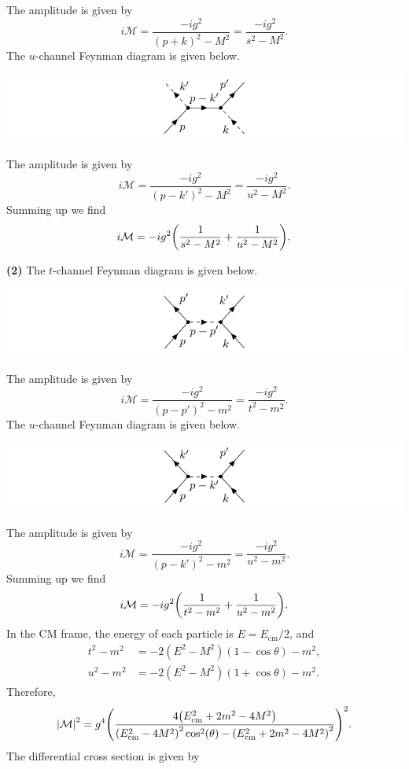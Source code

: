 \documentclass{article}
\makeatletter
\newcommand*{\shifttext}[1]{%
  \settowidth{\@tempdima}{#1}%
  \hspace{-\@tempdima}#1%
}
\newcommand{\plabel}[1]{%
\shifttext{\textbf{#1}\quad}%
}
\makeatother
\begin{document}
The amplitude is given by
\[ i\mathcal{M} = \frac{-ig^2}{(p+k)^2 - M^2} = \frac{-ig^2}{s^2-M^2}. \]
The $u$-channel Feynman diagram is given below.
\begin{center}
    \includegraphics{img/compton/compton-u.pdf}
\end{center}
The amplitude is given by
\[ i\mathcal{M} = \frac{-ig^2}{(p-k')^2 - M^2} = \frac{-ig^2}{u^2-M^2}. \]
Summing up we find
\[ i\mathcal{M} = -ig^2\qty(\frac{1}{s^2 - M^2} + \frac{1}{u^2 - M^2}). \]

\plabel{(2)}%
The $t$-channel Feynman diagram is given below.
\begin{center}
    \includegraphics{img/moller/moller-t.pdf}
\end{center}
The amplitude is given by
\[ i\mathcal{M} = \frac{-ig^2}{(p-p')^2 - m^2} = \frac{-ig^2}{t^2-m^2}. \]
The $u$-channel Feynman diagram is given below.
\begin{center}
    \includegraphics{img/moller/moller-u.pdf}
\end{center}
The amplitude is given by
\[ i\mathcal{M} = \frac{-ig^2}{(p-k')^2 - m^2} = \frac{-ig^2}{u^2-m^2}. \]
Summing up we find
\[ i\mathcal{M} = -ig^2\qty(\frac{1}{t^2 - m^2} + \frac{1}{u^2 - m^2}). \]
In the CM frame, the energy of each particle is $E = E_{\mathrm{cm}} / 2$, and
\begin{align*}
    t^2 - m^2 &= -2(E^2 - M^2)(1 - \cos\theta) - m^2, \\
    u^2 - m^2 &= -2(E^2 - M^2)(1 + \cos\theta) - m^2.
\end{align*}
Therefore,
\[ \abs{\mathcal{M}}^2 = g^4\qty(\frac{4 \qty(E_{\mathrm{cm}}^2+2 m^2-4 M^2)}{\qty(E_{\mathrm{cm}}^2-4 M^2)^2 \cos ^2(\theta )-\qty(E_{\mathrm{cm}}^2+2 m^2-4 M^2)^2})^2. \]
The differential cross section is given by
\end{document}

